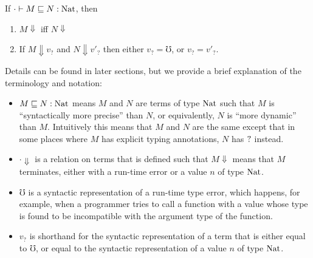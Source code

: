 

\begin{theorem}[Graduality]
  If $\cdot \vdash M \sqsubseteq N : \text{Nat}$, then
  \begin{enumerate}
    \item $M \Downarrow$ iff $N \Downarrow$
    \item If $M \Downarrow v_?$ and $N \Downarrow v'_?$ then either $v_? = \mho$, or $v_? = v'_?$.
  \end{enumerate}
\end{theorem}

Details can be found in later sections, but we provide a brief explanation of the terminology and notation:

\begin{itemize}
  \item $M \sqsubseteq N : \text{Nat}$ means $M$ and $N$ are terms of type $\text{Nat}$ such that
  $M$ is ``syntactically more precise'' than $N$, or equivalently, $N$ is 
  ``more dynamic'' than $M$. Intuitively this means that $M$ and $N$ are the
  same except that in some places where $M$ has explicit typing annotations,
  $N$ has $?$ instead.
  \item $\cdot \Downarrow$ is a relation on terms that is defined such that $M \Downarrow$ means
  that $M$ terminates, either with a run-time error or a value $n$ of type $\text{Nat}$.
  \item $\mho$ is a syntactic representation of a run-time type error, which
  happens, for example, when a programmer tries to call a function with a value whose type
  is found to be incompatible with the argument type of the function.
  \item $v_?$ is shorthand for the syntactic representation of a term that is either equal to
  $\mho$, or equal to the syntactic representation of a value $n$ of type $\text{Nat}$.
\end{itemize}


